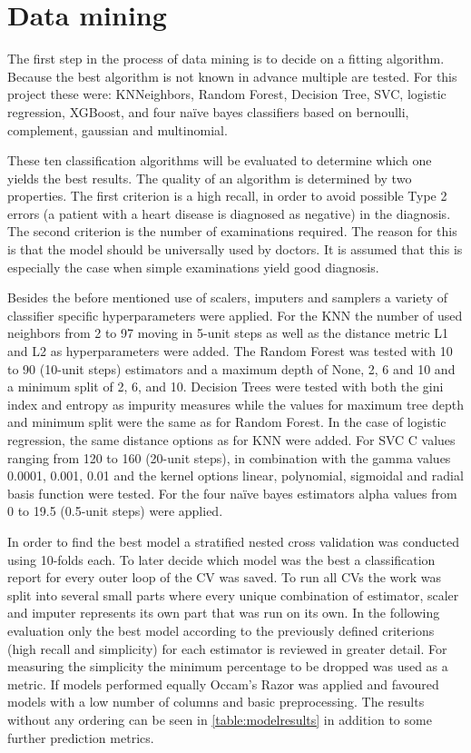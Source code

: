\section{Data mining} \label{sec:datamining}
The first step in the process of data mining is to decide on a fitting algorithm. Because the best algorithm is not known in advance multiple are tested. For this project these were: KNNeighbors, Random Forest, Decision Tree, SVC, logistic regression, XGBoost, and four naïve bayes classifiers based on bernoulli, complement, gaussian  and multinomial.

These ten classification algorithms will be evaluated to determine which one yields the best results. The quality of an algorithm is determined by two properties. The first criterion is a high recall, in order to avoid possible Type 2 errors (a patient with a heart disease is diagnosed as negative) in the diagnosis. The second criterion is the number of examinations required. The reason for this is that the model should be universally used by doctors. It is assumed that this is especially the case when simple examinations yield good diagnosis.

Besides the before mentioned use of scalers, imputers and samplers a variety of classifier specific hyperparameters were applied. For the KNN the number of used neighbors from 2 to 97 moving in 5-unit steps as well as the distance metric L1 and L2 as hyperparameters were added. The Random Forest was tested with 10 to 90 (10-unit steps) estimators and a maximum depth of None, 2, 6 and 10 and a minimum split of 2, 6, and 10. Decision Trees were tested with both the gini index and entropy as impurity measures while the values for maximum tree depth and minimum split were the same as for Random Forest. In the case of logistic regression, the same distance options as for KNN were added. For SVC C values ranging from 120 to 160 (20-unit steps), in combination with the gamma values 0.0001, 0.001, 0.01 and the kernel options linear, polynomial, sigmoidal and radial basis function were tested. For the four naïve bayes estimators alpha values from 0 to 19.5 (0.5-unit steps) were applied.

In order to find the best model a stratified nested cross validation was conducted using 10-folds each. To later decide which model was the best a classification report for every outer loop of the CV was saved. To run all CVs the work was split into several small parts where every unique combination of estimator, scaler and imputer represents its own part that was run on its own. In the following evaluation only the best model according to the previously defined criterions (high recall and simplicity) for each estimator is reviewed in greater detail. For measuring the simplicity the minimum percentage to be dropped was used as a metric. If models performed equally Occam's Razor was applied and favoured models with a low number of columns and basic preprocessing. The results without any ordering can be seen in \cref{table:modelresults} in addition to some further prediction metrics.


